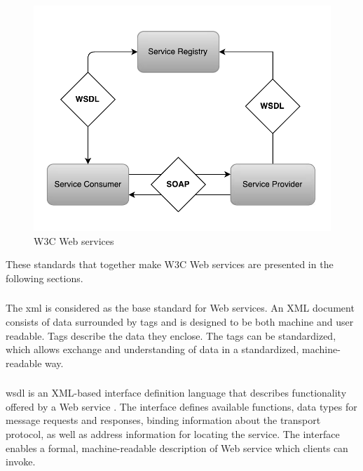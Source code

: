 \begin{figure}[h]
\centering
\includegraphics[scale=0.4]{images/web_services.png}
\caption{W3C Web services}
\label{figure-w3c-web-services}
\end{figure}

These standards that together make W3C Web services are presented in the
following sections.

\subsubsection{}

The \gls{xml}\cite{W3C-XML} is considered as the base standard for Web services.
An XML document consists of data surrounded by tags and is designed to be both
machine and user readable. Tags describe the data they enclose. The tags can be
standardized, which allows exchange and understanding of data in a standardized,
machine-readable way.


\subsubsection{}

\gls{wsdl} is an XML-based interface definition language that describes
functionality offered by a Web service \cite{w3c-wsdl}. The interface defines
available functions, data types for message requests and responses, binding
information about the transport protocol, as well as address information for
locating the service. The interface enables a formal, machine-readable
description of Web service which clients can invoke.

